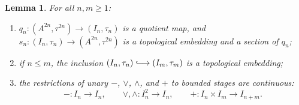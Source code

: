 \documentclass[preprint,3p]{elsarticle}
\theoremstyle{plain}
\newtheorem{lem}[thm]{Lemma}
\theoremstyle{definition}
\newcommand{\longhookrightarrow}{\lhook\joinrel\longrightarrow}
\numberwithin{equation}{section}
\begin{document}
\begin{lem}
\label{lem-stage-topology}
For all $n,m\geq1$:
\begin{enumerate}[label=(\alph*),ref=(\alph*)]
\item\label{lem-stage-topology-quotient}
$q_n\colon(A^{2n},\tau^{2n})\longrightarrow(I_n,\tau_n)$
is a quotient map, and
$s_n\colon(I_n,\tau_n)\longrightarrow(A^{2n},\tau^{2n})$
is a topological embedding and a section of $q_n$;
\item\label{lem-stage-topology-embedding}
if $n\leq m$, the inclusion
$(I_n,\tau_n)\longhookrightarrow(I_m,\tau_m)$ is a topological embedding;
\item\label{lem-stage-topology-operations}
the restrictions of unary $-$, $\vee$, $\wedge$, and $+$ to bounded
stages are continuous:
\[
 -\colon I_n\longrightarrow I_n,\qquad
 \vee,\wedge\colon I_n^2\longrightarrow I_n,\qquad
 +\colon I_n\times I_m\longrightarrow I_{n+m}.
\]
\end{enumerate}
\end{lem}
\end{document}
